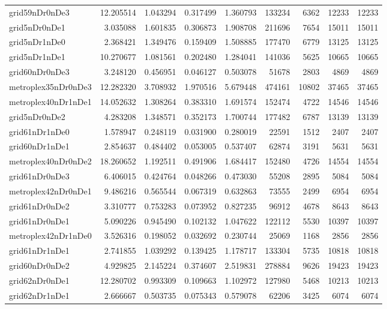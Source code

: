\begin{longtable}{|l|r|r|r|r|r|r|r|r|}
grid59nDr0nDe3 & 12.205514 & 1.043294 & 0.317499 & 1.360793 & 133234 & 6362 & 12233 & 12233 \\
grid5nDr0nDe1 & 3.035088 & 1.601835 & 0.306873 & 1.908708 & 211696 & 7654 & 15011 & 15011 \\
grid5nDr1nDe0 & 2.368421 & 1.349476 & 0.159409 & 1.508885 & 177470 & 6779 & 13125 & 13125 \\
grid5nDr1nDe1 & 10.270677 & 1.081561 & 0.202480 & 1.284041 & 141036 & 5625 & 10665 & 10665 \\
grid60nDr0nDe3 & 3.248120 & 0.456951 & 0.046127 & 0.503078 & 51678 & 2803 & 4869 & 4869 \\
metroplex35nDr0nDe3 & 12.282320 & 3.708932 & 1.970516 & 5.679448 & 474161 & 10802 & 37465 & 37465 \\
metroplex40nDr1nDe1 & 14.052632 & 1.308264 & 0.383310 & 1.691574 & 152474 & 4722 & 14546 & 14546 \\
grid5nDr0nDe2 & 4.283208 & 1.348571 & 0.352173 & 1.700744 & 177482 & 6787 & 13139 & 13139 \\
grid61nDr1nDe0 & 1.578947 & 0.248119 & 0.031900 & 0.280019 & 22591 & 1512 & 2407 & 2407 \\
grid60nDr1nDe1 & 2.854637 & 0.484402 & 0.053005 & 0.537407 & 62874 & 3191 & 5631 & 5631 \\
metroplex40nDr0nDe2 & 18.260652 & 1.192511 & 0.491906 & 1.684417 & 152480 & 4726 & 14554 & 14554 \\
grid61nDr0nDe3 & 6.406015 & 0.424764 & 0.048266 & 0.473030 & 55208 & 2895 & 5084 & 5084 \\
metroplex42nDr0nDe1 & 9.486216 & 0.565544 & 0.067319 & 0.632863 & 73555 & 2499 & 6954 & 6954 \\
grid61nDr0nDe2 & 3.310777 & 0.753283 & 0.073952 & 0.827235 & 96912 & 4678 & 8643 & 8643 \\
grid61nDr0nDe1 & 5.090226 & 0.945490 & 0.102132 & 1.047622 & 122112 & 5530 & 10397 & 10397 \\
metroplex42nDr1nDe0 & 3.526316 & 0.198052 & 0.032692 & 0.230744 & 25069 & 1168 & 2856 & 2856 \\
grid61nDr1nDe1 & 2.741855 & 1.039292 & 0.139425 & 1.178717 & 133304 & 5735 & 10818 & 10818 \\
grid60nDr0nDe2 & 4.929825 & 2.145224 & 0.374607 & 2.519831 & 278884 & 9626 & 19423 & 19423 \\
grid62nDr0nDe1 & 12.280702 & 0.993309 & 0.109663 & 1.102972 & 127980 & 5468 & 10213 & 10213 \\
grid62nDr1nDe1 & 2.666667 & 0.503735 & 0.075343 & 0.579078 & 62206 & 3425 & 6074 & 6074 \\

\end{longtable}
